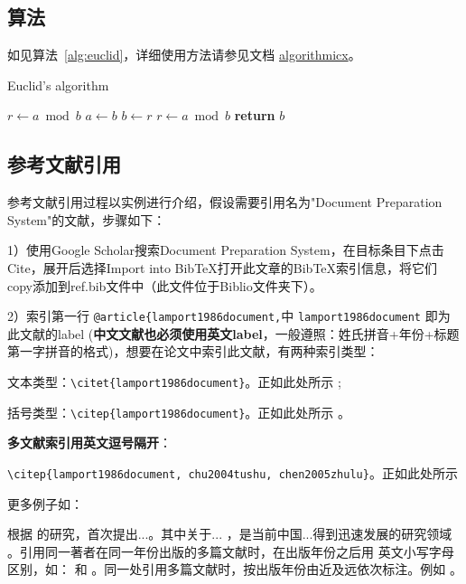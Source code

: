 \subsection{算法}

如见算法~\ref{alg:euclid}，详细使用方法请参见文档 \href{https://ctan.org/pkg/algorithmicx?lang=en}{algorithmicx}。

\begin{algorithm}[!htbp]
    \small
    \caption{Euclid's algorithm}\label{alg:euclid}
    \begin{algorithmic}[1]
        \State $r\gets a\bmod b$
        \State $a\gets b$
        \State $b\gets r$
        \State $r\gets a\bmod b$
        \EndWhile\label{euclidendwhile}
        \State \textbf{return} $b$
        \EndProcedure
    \end{algorithmic}
\end{algorithm}

\subsection{参考文献引用}

参考文献引用过程以实例进行介绍，假设需要引用名为"Document Preparation System"的文献，步骤如下：

1）使用Google Scholar搜索Document Preparation System，在目标条目下点击Cite，展开后选择Import into BibTeX打开此文章的BibTeX索引信息，将它们copy添加到ref.bib文件中（此文件位于Biblio文件夹下）。

2）索引第一行 \verb|@article{lamport1986document,|中 \verb|lamport1986document| 即为此文献的label (\textbf{中文文献也必须使用英文label}，一般遵照：姓氏拼音+年份+标题第一字拼音的格式)，想要在论文中索引此文献，有两种索引类型：

文本类型：\verb|\citet{lamport1986document}|。正如此处所示 \citet{lamport1986document}; 

括号类型：\verb|\citep{lamport1986document}|。正如此处所示 \citep{lamport1986document}。

\textbf{多文献索引用英文逗号隔开}：

\verb|\citep{lamport1986document, chu2004tushu, chen2005zhulu}|。正如此处所示 \citep{lamport1986document, chu2004tushu, chen2005zhulu}

更多例子如：

\citet{walls2013drought} 根据 \citet{betts2005aging} 的研究，首次提出...。其中关于... \citep{walls2013drought, betts2005aging}，是当前中国...得到迅速发展的研究领域 \citep{chen1980zhongguo, bravo1990comparative}。引用同一著者在同一年份出版的多篇文献时，在出版年份之后用
英文小写字母区别，如：\citep{yuan2012lana, yuan2012lanb, yuan2012lanc} 和 \citet{yuan2012lana, yuan2012lanb, yuan2012lanc}。同一处引用多篇文献时，按出版年份由近及远依次标注。例如 \citep{chen1980zhongguo, stamerjohanns2009mathml, hls2012jinji, niu2013zonghe}。

